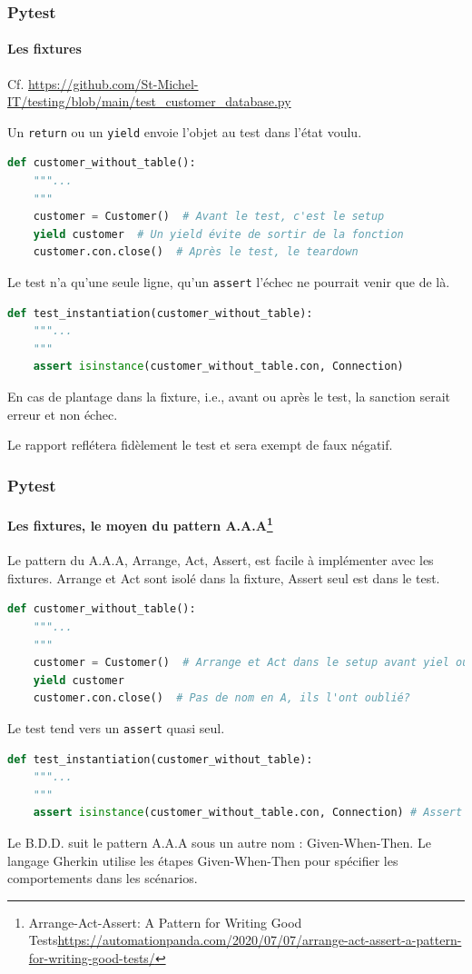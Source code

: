 \documentclass{beamer}
\begin{document}
    \begin{frame}[fragile]
        \frametitle{Pytest}
        \framesubtitle{Les fixtures}
        \transdissolve
        Cf. \url{https://github.com/St-Michel-IT/testing/blob/main/test_customer_database.py}

        Un \lstinline{return} ou un \lstinline{yield} envoie l'objet au test dans l'état voulu.
        \begin{lstlisting}[language=Python]
def customer_without_table():
    """...
    """
    customer = Customer()  # Avant le test, c'est le setup
    yield customer  # Un yield évite de sortir de la fonction
    customer.con.close()  # Après le test, le teardown
        \end{lstlisting}
        Le test n'a qu'une seule ligne, qu'un \lstinline{assert} l'échec ne
        pourrait venir que de là.
        \begin{lstlisting}[language=Python]
def test_instantiation(customer_without_table):
    """...
    """
    assert isinstance(customer_without_table.con, Connection)
        \end{lstlisting}
        En cas de plantage dans la fixture, i.e., avant ou après le test, la sanction
        serait erreur et non échec.

        Le rapport reflétera fidèlement le test et sera exempt de faux négatif.
    \end{frame}

    \begin{frame}[fragile]
        \frametitle{Pytest}
        \framesubtitle{Les fixtures, le moyen du pattern A.A.A\footnote{Arrange-Act-Assert: A Pattern for Writing Good Tests\url{https://automationpanda.com/2020/07/07/arrange-act-assert-a-pattern-for-writing-good-tests/}}}
        \transdissolve
        Le pattern du A.A.A, Arrange, Act, Assert, est facile à implémenter avec les fixtures.
        Arrange et Act sont isolé dans la fixture, Assert seul est dans le test.

        \begin{lstlisting}[language=Python]
def customer_without_table():
    """...
    """
    customer = Customer()  # Arrange et Act dans le setup avant yiel ou return
    yield customer
    customer.con.close()  # Pas de nom en A, ils l'ont oublié?
        \end{lstlisting}
        Le test tend vers un \lstinline{assert} quasi seul.
        \begin{lstlisting}[language=Python]
def test_instantiation(customer_without_table):
    """...
    """
    assert isinstance(customer_without_table.con, Connection) # Assert
        \end{lstlisting}
        Le B.D.D. suit le pattern A.A.A sous un autre nom : Given-When-Then.
        Le langage Gherkin utilise les étapes Given-When-Then pour spécifier les comportements dans les scénarios.
    \end{frame}
\end{document}
